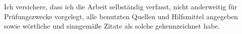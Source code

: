 Ich versichere, dass ich die Arbeit selbständig verfasst, nicht anderweitig für
Prüfungszwecke vorgelegt, alle benutzten Quellen und Hilfsmittel angegeben sowie
wörtliche und sinngemäße Zitate als solche gekennzeichnet habe.

